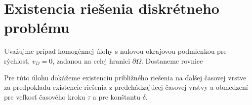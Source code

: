 \chapter{Existencia riešenia diskrétneho problému}
 
Uvažujme prípad homogénnej úlohy s nulovou okrajovou podmienkou pre rýchlosť,
$v_D=0$, zadanou na celej hranici $\partial \Omega$. Dostaneme rovnice


Pre túto úlohu dokážeme existenciu približného riešenia na ďalšej časovej
vrstve za predpokladu existencie riešenia z predchádzajúcej časovej vrstvy a
obmedzení pre veľkosť časového kroku $\tau$ a pre konštantu $\delta$.

